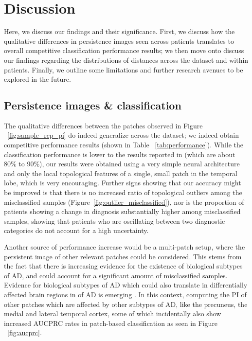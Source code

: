 \documentclass{article}
\begin{document}
\section{Discussion}\label{sec:discussion}

Here, we discuss our findings and their significance. First, we discuss how the qualitative differences in persistence images seen across patients translates to overall competitive classification performance results; we then move onto discuss our findings regarding the distributions of distances across the dataset and within patients. Finally, we outline some limitations and further research avenues to be explored in the future.

\subsection{Persistence images \& classification}

The qualitative differences between the patches observed in Figure ~\ref{fig:sample_rep_pi} do indeed generalize across the dataset; we indeed obtain competitive performance results (shown in Table ~\ref{tab:performance}). While the classification performance is lower to the results reported in \citep{wen2020convolutional} (which are about 80\% to 90\%), our results were obtained using a very simple neural architecture and only the local topological features of a single, small patch in the temporal lobe, which is very encouraging. Further signs showing that our accuracy might be improved is that there is no increased ratio of topological outliers among the misclassified samples (Figure~\ref{fig:outlier_misclassified}), nor is the proportion of patients showing a change in diagnosis substantially higher among misclassified samples, showing that patients who are oscillating between two diagnostic categories do not account for a high uncertainty.

Another source of performance increase would be a multi-patch setup, where the persistent image of other relevant patches could be considered. This stems from the fact that there is increasing evidence for the existence of biological subtypes of AD, and could account for a significant amount of misclassified samples. Evidence for biological subtypes of AD which could also translate in differentially affected brain regions in of AD is emerging \citep{tijms2020pathophysiological,poulakis2018heterogeneous}. In this context, computing the PI of other patches which are affected by other subtypes of AD, like the precuneus, the medial and lateral temporal cortex, some of which incidentally also show increased AUCPRC rates in patch-based classification as seen in Figure ~\ref{fig:aucprc}.
\end{document}

